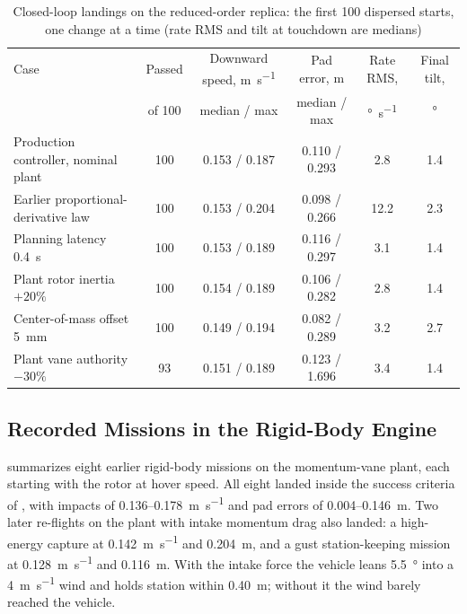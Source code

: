 \documentclass[10pt,letterpaper]{article}
\begin{document}
\begin{table}[t]
\caption{Closed-loop landings on the reduced-order replica: the first 100 dispersed starts, one change at a time (rate RMS and tilt at touchdown are medians)}
\label{tab:variants}
\centering
\small
\begin{tabular}{lccccc}
\toprule
Case & Passed & Downward speed, \si{\metre\per\second} & Pad error, \si{\metre} & Rate RMS, & Final tilt, \\
 & of 100 & median / max & median / max & \si{\degree\per\second} & \si{\degree} \\
\midrule
Production controller, nominal plant & 100 & 0.153 / 0.187 & 0.110 / 0.293 & 2.8 & 1.4 \\
Earlier proportional-derivative law & 100 & 0.153 / 0.204 & 0.098 / 0.266 & 12.2 & 2.3 \\
Planning latency \SI{0.4}{\second} & 100 & 0.153 / 0.189 & 0.116 / 0.297 & 3.1 & 1.4 \\
Plant rotor inertia $+20\%$ & 100 & 0.154 / 0.189 & 0.106 / 0.282 & 2.8 & 1.4 \\
Center-of-mass offset \SI{5}{\milli\metre} & 100 & 0.149 / 0.194 & 0.082 / 0.289 & 3.2 & 2.7 \\
Plant vane authority $-30\%$ & 93 & 0.151 / 0.189 & 0.123 / 1.696 & 3.4 & 1.4 \\
\bottomrule
\end{tabular}
\end{table}

\subsection{Recorded Missions in the Rigid-Body Engine}
\label{sec:results-missions}

 summarizes eight earlier rigid-body missions on the momentum-vane plant, each starting with the rotor at hover speed.
All eight landed inside the success criteria of , with impacts of 0.136--\SI{0.178}{\metre\per\second} and pad errors of 0.004--\SI{0.146}{\metre}.
Two later re-flights on the plant with intake momentum drag also landed: a high-energy capture at \SI{0.142}{\metre\per\second} and \SI{0.204}{\metre}, and a gust station-keeping mission at \SI{0.128}{\metre\per\second} and \SI{0.116}{\metre}.
With the intake force the vehicle leans \SI{5.5}{\degree} into a \SI{4}{\metre\per\second} wind and holds station within \SI{0.40}{\metre}; without it the wind barely reached the vehicle.
\end{document}
